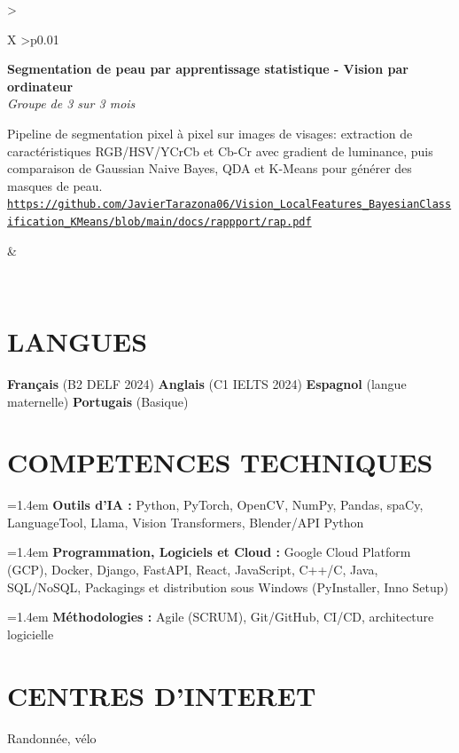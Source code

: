 \documentclass[letterpaper,10pt]{article}
\newcommand{\indentbox}[2][1em]{\hspace*{#1}\parbox{\dimexpr\linewidth-#1\relax}{#2}}
\begin{document}
\begin{tabularx}{\textwidth}{>{\raggedright\arraybackslash}X >{\raggedleft\arraybackslash}p{0.01\textwidth}}
    \begin{minipage}[t]{\linewidth}\raggedright
      \textbf{Segmentation de peau par apprentissage statistique - Vision par ordinateur}\\
      \textit{\footnotesize Groupe de 3 sur 3 mois }\\
      \indentbox{\footnotesize Pipeline de segmentation pixel à pixel sur images de visages: extraction de caractéristiques RGB/HSV/YCrCb et Cb-Cr avec gradient de luminance, puis comparaison de Gaussian Naive Bayes, QDA et K-Means pour générer des masques de peau. \href{https://github.com/JavierTarazona06/Vision_LocalFeatures_BayesianClassification_KMeans/blob/main/docs/rappport/rap.pdf}{\nolinkurl{https://github.com/JavierTarazona06/Vision_LocalFeatures_BayesianClassification_KMeans/blob/main/docs/rappport/rap.pdf}}}
    \end{minipage}
    &
    \begin{minipage}[t]{\linewidth}\raggedleft %
    \end{minipage}\\

  \end{tabularx}



  
\section{\textcolor{mydarkgreen}{\textbf{LANGUES}}}
{\footnotesize
\noindent \textbf{Français} (B2 \textendash{} DELF 2024) \hspace{1.2em} \textbf{Anglais} (C1 \textendash{} IELTS 2024) \hspace{1.2em} \textbf{Espagnol} (langue maternelle) \hspace{1.2em} \textbf{Portugais} (Basique)
}

\vspace{-0.05cm}
\section{\textcolor{mydarkgreen}{\textbf{COMPETENCES TECHNIQUES}}}
{\scriptsize
\setlength{\parindent}{0pt}
\hangindent=1.4em \textbf{Outils d'IA :} Python, PyTorch, OpenCV, NumPy, Pandas, spaCy, LanguageTool, Llama, Vision Transformers, Blender/API Python\par
\hangindent=1.4em \textbf{Programmation, Logiciels et Cloud :} Google Cloud Platform (GCP), Docker, Django, FastAPI, React, JavaScript, C++/C, Java, SQL/NoSQL, Packagings et distribution sous Windows (PyInstaller, Inno Setup)\par
\hangindent=1.4em \textbf{Méthodologies :} Agile (SCRUM), Git/GitHub, CI/CD, architecture logicielle\par
}

\vspace{-0.05cm}
\section{\textcolor{mydarkgreen}{\textbf{CENTRES D'INTERET}}}
{\footnotesize
\noindent Randonnée, vélo
}



\end{document}
